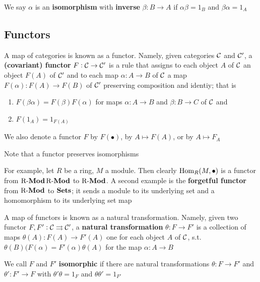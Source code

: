\documentclass[11pt]{article}
\begin{document}
We say \(\alpha\) is an \textbf{isomorphism} with \textbf{inverse} \(\beta:B\to A\) if \(\alpha\beta=1_B\)
and \(\beta\alpha=1_A\)
\subsection*{Functors \label{6.2}}
\label{sec:orgf334f06}
A map of categories is known as a functor. Namely, given categories \(\mathcal{C}\)
and \(\mathcal{C}'\), a \textbf{(covariant) functor} \(F:\mathcal{C}\to\mathcal{C}'\) is a rule that
assigns to each object \(A\) of \(\mathcal{C}\) an object \(F(A)\) of \(\mathcal{C}'\)
and to each map \(\alpha:A\to B\) of \(\mathcal{C}\) a map \(F(\alpha):F(A)\to F(B)\) of
\(\mathcal{C}'\) preserving composition and identiy; that is
\begin{enumerate}
\item \(F(\beta\alpha)=F(\beta)F(\alpha)\) for maps \(\alpha:A\to B\) and \(\beta:B\to C\) of
\(\mathcal{C}\) and
\item \(F(1_A)=1_{F(A)}\)
\end{enumerate}


We also denote a functor \(F\) by \(F(\bullet)\), by \(A\mapsto F(A)\), or by
\(A\mapsto F_A\)

Note that a functor preserves isomorphisms

For example, let \(R\) be a ring, \(M\) a module. Then clearly
\(\operatorname{Hom}_R(M,\bullet)\) is a functor from \(\operatorname{R-\textbf{Mod}} \operatorname{R-\textbf{Mod}}\) to \(\operatorname{R-\textbf{Mod}}\). A
second example is the \textbf{forgetful functor} from \(\operatorname{R-\textbf{Mod}}\) to \(\operatorname{\textbf{Sets}}\); it sends
a module to its underlying set and a homomorphism to its underlying set map

A map of functors is known as a natural transformation. Namely, given two
functor \(F,F':\mathcal{C}\rightrightarrows\mathcal{C}'\), a \textbf{natural transformation}
\(\theta:F\to F'\) is a collection of maps \(\theta(A):F(A)\to F'(A)\) one for each
object \(A\) of \(\mathcal{C}\), s.t. \(\theta(B)(F(\alpha)=F'(\alpha)\theta(A)\) for the map \(\alpha:A\to B\)
\begin{center}
\end{center}

We call \(F\) and \(F'\) \textbf{isomorphic} if there are natural transformations
\(\theta:F\to F'\) and \(\theta':F'\to F\) with \(\theta'\theta=1_F\) and \(\theta\theta'=1_{F'}\)
\end{document}
